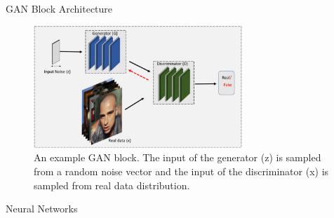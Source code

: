 \documentclass{beamer}
\begin{document}
\begin{frame}{GAN Block Architecture} 
    \begin{figure}[h]
        \centering
        \includegraphics[width=0.7\textwidth]{Basic GAN blueprint.jpg} %
        \caption{ An example GAN block. The input of the generator (z) is sampled from a random noise vector and the input of the discriminator (x) is sampled from real data distribution.}
    \end{figure}
\end{frame}

\begin{frame}{Neural Networks} 
    \begin{figure}[h]
        \centering
        \captionsetup{labelformat=empty}
    \end{figure}
\end{frame}
\end{document}
